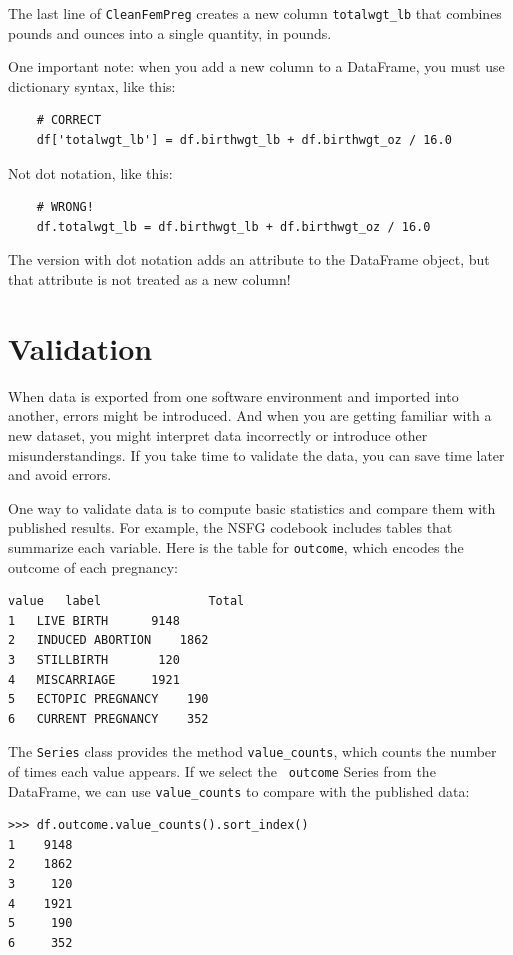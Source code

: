 \documentclass[12pt]{book}
\begin{document}
The last line of {\tt CleanFemPreg} creates a new
column \verb"totalwgt_lb" that combines pounds and ounces into
a single quantity, in pounds.

One important note: when you add a new column to a DataFrame, you
must use dictionary syntax, like this:

\begin{verbatim}
    # CORRECT
    df['totalwgt_lb'] = df.birthwgt_lb + df.birthwgt_oz / 16.0 
\end{verbatim}

Not dot notation, like this:

\begin{verbatim}
    # WRONG!
    df.totalwgt_lb = df.birthwgt_lb + df.birthwgt_oz / 16.0 
\end{verbatim}

The version with dot notation adds an attribute to the DataFrame
object, but that attribute is not treated as a new column!


\section{Validation}

When data is exported from one software environment and imported into
another, errors might be introduced.  And when you are
getting familiar with a new dataset, you might interpret data
incorrectly or introduce other misunderstandings.  If you take
time to validate the data, you can save time later and avoid errors.

One way to validate data is to compute basic statistics and compare
them with published results.  For example, the NSFG codebook includes
tables that summarize each variable.  Here is the table for
{\tt outcome}, which encodes the outcome of each pregnancy:

\begin{verbatim}
value	label	 	        Total
1	LIVE BIRTH	 	9148
2	INDUCED ABORTION	1862
3	STILLBIRTH	 	 120
4	MISCARRIAGE	 	1921
5	ECTOPIC PREGNANCY	 190
6	CURRENT PREGNANCY	 352
\end{verbatim}

The {\tt Series} class provides the method \verb"value_counts", which
counts the number of times each value appears.  If we select the {\tt
  outcome} Series from the DataFrame, we can use \verb"value_counts"
to compare with the published data:

\begin{verbatim}
>>> df.outcome.value_counts().sort_index()
1    9148
2    1862
3     120
4    1921
5     190
6     352
\end{verbatim}
\end{document}
